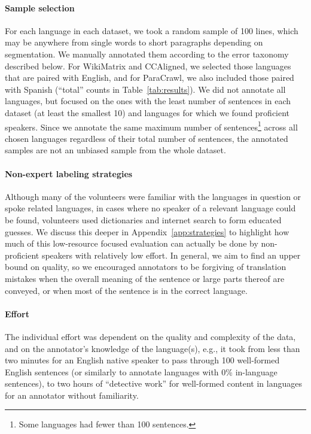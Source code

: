 \paragraph{Sample selection} For each language in each dataset, we took a random sample of 100 lines, which may be anywhere from single words to short paragraphs depending on segmentation.
We manually annotated them according to the error taxonomy described below. For WikiMatrix and CCAligned, we selected those languages that are paired with English, and for ParaCrawl, we also included those paired with Spanish (``total'' counts in Table~\ref{tab:results}).
We did not annotate all languages, but focused on the ones with the least number of sentences in each dataset (at least the smallest 10) and languages for which we found proficient speakers.
Since we annotate the same maximum number of sentences\footnote{Some languages had fewer than 100 sentences.} across all chosen languages regardless of their total number of sentences, the annotated samples are not an unbiased sample from the whole dataset.

\paragraph{Non-expert labeling strategies}
Although many of the volunteers were familiar with the languages in question or spoke related languages, in cases where no speaker of a relevant language could be found, volunteers used dictionaries and internet search to form educated guesses. We discuss this deeper in Appendix~\ref{app:strategies} to highlight how much of this low-resource focused evaluation can actually be done by non-proficient speakers with relatively low effort.
In general, we aim to find an upper bound on quality, so we encouraged annotators to be forgiving of translation mistakes when the overall meaning of the sentence or large parts thereof are conveyed, or when most of the sentence is in the correct language.

\paragraph{Effort} The individual effort was dependent on the quality and complexity of the data, and on the annotator's knowledge of the language(s), e.g., it took from less than two minutes for an English native speaker to pass through 100 well-formed English sentences (or similarly to annotate languages with 0\% in-language sentences), to two hours of ``detective work'' for well-formed content in languages for an annotator without familiarity.

